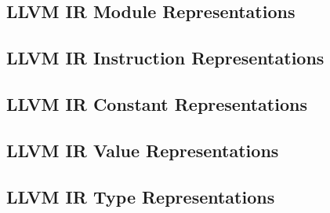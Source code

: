 \subsection{LLVM IR Module Representations}
\label{app:ir/ir_doc}



\clearpage

\subsection{LLVM IR Instruction Representations}
\label{app:ir/instruction_doc}



\clearpage

\subsection{LLVM IR Constant Representations}
\label{app:ir/constant_doc}



\clearpage

\subsection{LLVM IR Value Representations}
\label{app:ir/value_doc}



\clearpage

\subsection{LLVM IR Type Representations}
\label{app:ir/types_doc}



